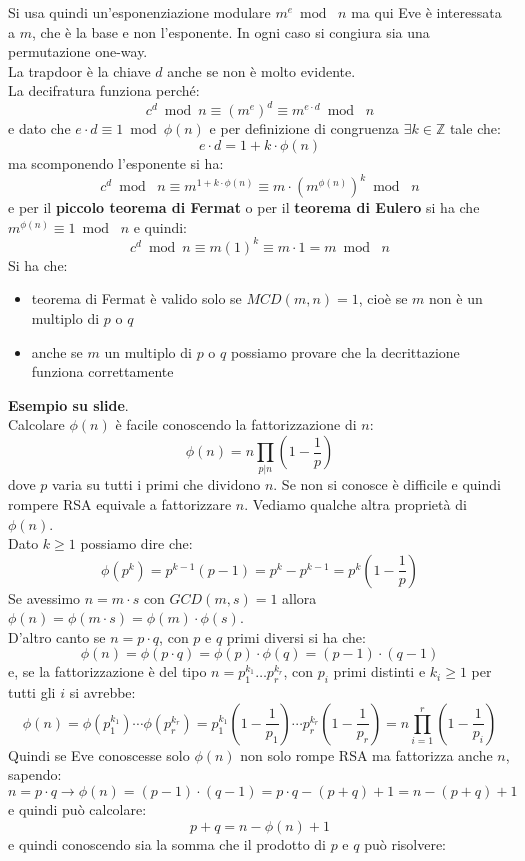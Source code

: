 \documentclass[a4paper,12pt, oneside]{book}
\begin{document}
Si usa quindi un'esponenziazione modulare $m^e\bmod\,\,n$ ma qui Eve è
interessata a $m$, che è la base e non l'esponente. In ogni caso si congiura sia
una permutazione one-way.\\
La trapdoor è la chiave $d$ anche se non è molto evidente.\\
La decifratura funziona perché:
\[c^d\bmod n\equiv (m^e)^d\equiv m^{e\cdot d}\bmod\,\,n\]
e dato che $e\cdot d\equiv 1\bmod\phi(n)$ e per definizione di congruenza
$\exists k\in\mathbb{Z}$ tale che:
\[e\cdot d=1+k\cdot\phi(n)\]
ma scomponendo l'esponente si ha:
\[c^d\bmod\,\,n\equiv m^{1+k\cdot\phi(n)}\equiv m\cdot (m^{\phi(n)})^k\bmod \,\,n\]
e per il \textbf{piccolo teorema di Fermat} o per il \textbf{teorema di Eulero}
si ha che $m^{\phi(n)}\equiv 1\bmod \,\,n$ e quindi:
\[c^d\bmod n\equiv m(1)^k\equiv m\cdot 1 = m\bmod \,\,n\]
Si ha che:
\begin{itemize}
  \item teorema di Fermat è valido solo se $MCD (m, n) = 1$, cioè se $m$ non è
  un   multiplo di $p$ o $q$ 
  \item anche se $m$ un multiplo di $p$ o $q$  possiamo provare
  che la decrittazione funziona correttamente 
\end{itemize}
\textbf{Esempio su slide}.\\
Calcolare $\phi(n)$ è facile conoscendo la fattorizzazione di $n$:
\[\phi(n)=n\prod_{p|n}\left(1-\frac{1}{p}\right)\]
dove $p$ varia su tutti i primi che dividono $n$. Se non si conosce è difficile
e quindi rompere RSA equivale a  fattorizzare $n$.
Vediamo qualche altra proprietà di $\phi(n)$. \\
Dato $k\geq 1$ possiamo dire che:
\[\phi(p^k)=p^{k-1}(p-1)=p^k-p^{k-1}=p^k\left(1-\frac{1}{p}\right)\]
Se avessimo $n=m\cdot s$ con $GCD(m,s)=1$ allora $\phi(n)=\phi(m\cdot
s)=\phi(m)\cdot \phi(s)$.\\
D'altro canto se $n=p\cdot q$, con $p$ e $q$ primi diversi si ha che:
\[\phi(n)=\phi(p\cdot q)=\phi(p)\cdot \phi(q)=(p-1)\cdot (q-1)\]
e, se la fattorizzazione è del tipo $n=p_1^{k_1}\ldots p_r^{k_r}$, con $p_i$
primi distinti e $k_i\geq 1$ per tutti gli $i$ si avrebbe:
\[\phi(n)=\phi(p_1^{k_1})\cdots
  \phi(p_r^{k_r})=p_1^{k_1}\left(1-\frac{1}{p_1}\right)\cdots
  p_r^{k_r}\left(1-\frac{1}{p_r}\right)=n\prod_{i=1}^r
  \left(1-\frac{1}{p_i}\right)\]
Quindi se Eve conoscesse solo $\phi(n)$ non solo rompe RSA ma fattorizza anche
$n$, sapendo:
\[n=p\cdot q\to \phi(n)=(p-1)\cdot(q-1)=p\cdot q-(p+q)+1=n-(p+q)+1\]
e quindi può calcolare:
\[p+q=n-\phi(n)+1\]
e quindi conoscendo sia la somma che il prodotto di $p$ e $q$ può risolvere:
\end{document}
